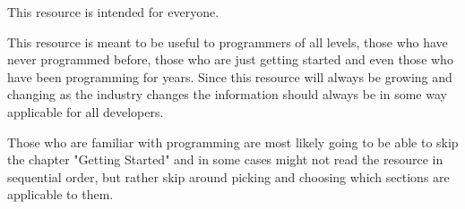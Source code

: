 This resource is intended for everyone.
\par

This resource is meant to be useful to programmers of all levels, those who have never programmed before, those who are just
getting started and even those who have been programming for years.
Since this resource will always be growing and changing as the industry changes the information should always be in some
way applicable for all developers.
\par

Those who are familiar with programming are most likely going to be able to skip the chapter "Getting Started" and in
some cases might not read the resource in sequential order, but rather skip around picking and choosing which sections are
applicable to them.
